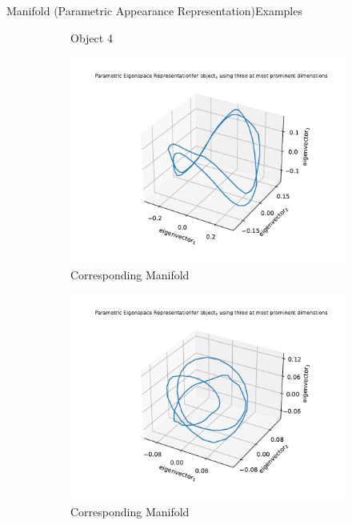 \documentclass[aspectratio=169, handout, 10pt, hyperref=colorlinks]{beamer}
\begin{document}
\begin{frame}{Manifold (Parametric Appearance Representation)}{Examples}
\begin{figure}
\begin{subfigure}{0.32\linewidth}
            \vspace{1em}
            \caption{Object 4}
        \end{subfigure}
        \begin{subfigure}{0.32\linewidth}
            \centering
            \includegraphics[width = \linewidth]{splines/2.pdf}
            \caption{Corresponding Manifold}
        \end{subfigure}
        \begin{subfigure}{0.32\linewidth}
            \centering
            \includegraphics[width = \linewidth]{splines/3.pdf}
            \caption{Corresponding Manifold}
        \end{subfigure}
        \begin{subfigure}{0.32\linewidth}

\end{subfigure}
\end{figure}
\end{frame}
\end{document}
